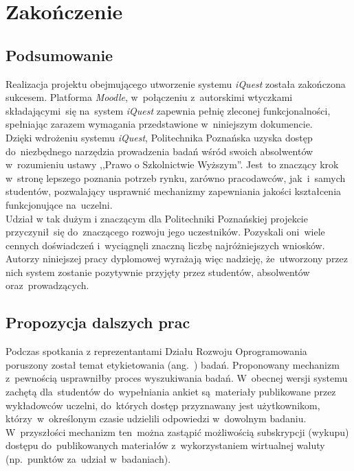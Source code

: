 \chapter{Zakończenie}
\label{Chapter9}

\section{Podsumowanie}
\label{Chapter91}

Realizacja projektu obejmującego utworzenie systemu \textit{iQuest} została zakończona sukcesem. Platforma \textit{Moodle}, w~połączeniu z~autorskimi wtyczkami składającymi~się na~system \textit{iQuest} zapewnia pełnię zleconej funkcjonalności, spełniając zarazem wymagania przedstawione w~niniejszym dokumencie. \\

Dzięki wdrożeniu systemu \textit{iQuest}, Politechnika Poznańska uzyska dostęp do~niezbędnego narzędzia prowadzenia badań wśród swoich absolwentów w~rozumieniu ustawy ,,Prawo o Szkolnictwie Wyższym''. Jest~to znaczący krok w~stronę lepszego poznania potrzeb rynku, zarówno pracodawców, jak~i~samych studentów, pozwalający usprawnić mechanizmy zapewniania jakości kształcenia funkcjonujące na~uczelni. \\

Udział w tak dużym i znaczącym dla Politechniki Poznańskiej projekcie przyczynił~się do~znaczącego rozwoju jego uczestników. Pozyskali oni~wiele cennych doświadczeń i~wyciągnęli znaczną liczbę najróżniejszych wniosków. Autorzy niniejszej pracy dyplomowej wyrażają więc nadzieję, że~utworzony przez nich system zostanie pozytywnie przyjęty przez studentów, absolwentów oraz~prowadzących.

\section{Propozycja dalszych prac}
\label{Chapter92}

Podczas spotkania z reprezentantami Działu Rozwoju Oprogramowania poruszony został temat etykietowania (ang.~) badań. Proponowany mechanizm z~pewnością usprawniłby proces wyszukiwania badań. W~obecnej wersji systemu zachętą dla~studentów do~wypełniania ankiet są~materiały publikowane przez wykładowców uczelni, do~których dostęp przyznawany jest użytkownikom, którzy~w~określonym czasie udzielili odpowiedzi w~dowolnym badaniu. W~przyszłości mechanizm ten~można zastąpić możliwością subskrypcji (wykupu) dostępu do~publikowanych materiałów z~wykorzystaniem wirtualnej waluty (np.~punktów za~udział w~badaniach).